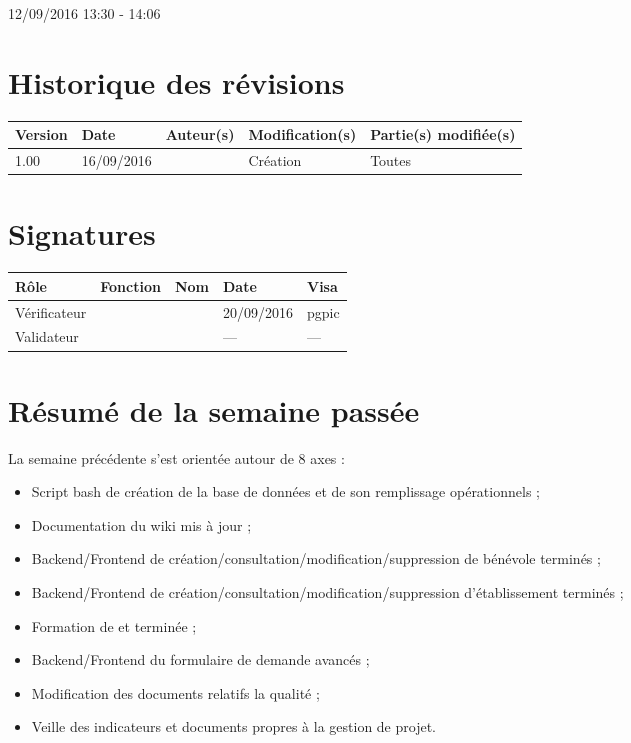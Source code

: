 \documentclass [a4paper] {article}
\begin{document}
12/09/2016			 				%
\hfill   
\hfill 	 13:30 - 14:06				%


\section*{Historique des révisions}
\begin{center}
			\begin{tabular}{| p{2.5cm} | p{3cm} | p{3cm} | p{3cm} | p{3.5cm} |}
				\hline
				\rowcolor{Gray}
				Version & Date & Auteur(s) & Modification(s) & Partie(s) modifiée(s)		 \\
				\hline
				1.00 & 16/09/2016 & \Kafui & Création & Toutes \\
				\hline			
			\end{tabular}
		\end{center}

\section*{Signatures}

		\begin{center}
			\begin{tabular}{| p{2.5cm} | p{4cm} | p{3cm} | p{3cm} | p{2.5cm} |}
				\hline
				\rowcolor{Gray}
				Rôle & Fonction & Nom & Date & Visa		 \\
				\hline
				Vérificateur & \RGC & \Melissa & 20/09/2016 & pgpic \\[30pt]
				\hline
				Validateur & \CP & \Pierre &  --- & --- \\[30pt]	
				\hline
			\end{tabular}
		\end{center}

\section{Résumé de la semaine passée}
La semaine précédente s'est orientée autour de 8 axes :  
\begin{itemize}
\item Script bash de création de la base de données et de son remplissage opérationnels ;
\item Documentation du wiki mis à jour ;
\item Backend/Frontend de création/consultation/modification/suppression de bénévole terminés ;
\item Backend/Frontend de création/consultation/modification/suppression d'établissement terminés ;
\item Formation de \Juliana{} et \Francois{} terminée ;
\item Backend/Frontend du formulaire de demande avancés ;
\item Modification des documents relatifs la qualité ;
\item Veille des indicateurs et documents propres à la gestion de projet.
\end{itemize} 
\end{document}
